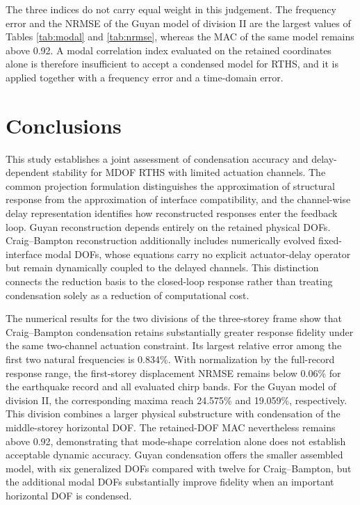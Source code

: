 \documentclass[a4paper,fleqn,review,12pt]{cas-sc}
\numberwithin{equation}{section}
\begin{document}
The three indices do not carry equal weight in this judgement. The frequency error and the NRMSE of the Guyan model of division II are the largest values of Tables \ref{tab:modal} and \ref{tab:nrmse}, whereas the MAC of the same model remains above 0.92. A modal correlation index evaluated on the retained coordinates alone is therefore insufficient to accept a condensed model for RTHS, and it is applied together with a frequency error and a time-domain error.




\section{Conclusions} \label{sec6}

This study establishes a joint assessment of condensation accuracy and delay-dependent stability for MDOF RTHS with limited actuation channels. The common projection formulation distinguishes the approximation of structural response from the approximation of interface compatibility, and the channel-wise delay representation identifies how reconstructed responses enter the feedback loop. Guyan reconstruction depends entirely on the retained physical DOFs. Craig--Bampton reconstruction additionally includes numerically evolved fixed-interface modal DOFs, whose equations carry no explicit actuator-delay operator but remain dynamically coupled to the delayed channels. This distinction connects the reduction basis to the closed-loop response rather than treating condensation solely as a reduction of computational cost.

The numerical results for the two divisions of the three-storey frame show that Craig--Bampton condensation retains substantially greater response fidelity under the same two-channel actuation constraint. Its largest relative error among the first two natural frequencies is 0.834\%. With normalization by the full-record response range, the first-storey displacement NRMSE remains below 0.06\% for the earthquake record and all evaluated chirp bands. For the Guyan model of division II, the corresponding maxima reach 24.575\% and 19.059\%, respectively. This division combines a larger physical substructure with condensation of the middle-storey horizontal DOF. The retained-DOF MAC nevertheless remains above 0.92, demonstrating that mode-shape correlation alone does not establish acceptable dynamic accuracy. Guyan condensation offers the smaller assembled model, with six generalized DOFs compared with twelve for Craig--Bampton, but the additional modal DOFs substantially improve fidelity when an important horizontal DOF is condensed.
\end{document}
